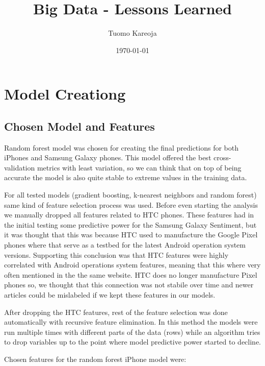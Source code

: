 \documentclass[12pt,a4paper,leqno]{report}
\title{Big Data - Lessons Learned}
\author{Tuomo Kareoja}
\date{\today}
\theoremstyle{plain}
\theoremstyle{definition}
\theoremstyle{remark}
\begin{document}
\maketitle

\newpage

\section{Model Creationg}

\subsection{Chosen Model and Features}

Random forest model was chosen for creating the final predictions for both iPhones
and Samsung Galaxy phones. This model offered the best cross-validation metrics
with least variation, so we can think that on top of being accurate the model
is also quite stable to extreme values in the training data.

For all tested models (gradient boosting, k-nearest neighbors and random forest) same kind of
feature selection process was used. Before even starting the analysis we manually dropped
all features related to HTC phones. These features had in the initial testing some predictive
power for the Samsung Galaxy Sentiment, but it was thought that this was because
HTC used to manufacture the Google Pixel phones where that serve as a testbed for the latest
Android operation system versions. Supporting this conclusion was that HTC features were
highly correlated with Android operations system features, meaning that this where very
often mentioned in the the same website. HTC does no longer manufacture Pixel
phones so, we thought that this connection was not stabile over time and newer articles
could be mislabeled if we kept these features in our models.

After dropping the HTC features, rest of the feature selection was done automatically
with recursive feature elimination. In this method the models were run multiple times with
different parts of the data (rows) while an algorithm tries to drop variables up to the point
where model predictive power started to decline.

Chosen features for the random forest iPhone model were:
\end{document}
